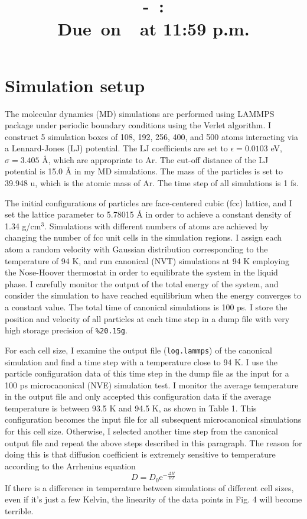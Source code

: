 \documentclass{article}
\title{
    \vspace{2in}
    \textmd{\textbf{\hmwkClassNo\ -\ \hmwkClass:\ \hmwkTitle}}\\
    \normalsize\vspace{0.1in}\small{Due\ on\ \hmwkDueDate\ at 11:59 p.m.}\\
    \vspace{0.1in}\large{\textit{\hmwkClassInstructor}}
    \vspace{3in}
}
\author{\hmwkAuthorName}
\date{}
\newcommand{\Exp}[1]{\mathrm{e}^{#1}}
\begin{document}
\maketitle

\pagebreak

\section{Simulation setup}

The molecular dynamics (MD) simulations are performed using LAMMPS package under periodic boundary conditions using the Verlet algorithm. I construct 5 simulation boxes of 108, 192, 256, 400, and 500 atoms interacting via a Lennard-Jones (LJ) potential. The LJ coefficients are set to $\epsilon = 0.0103$ eV, $\sigma = 3.405$ \AA, which are appropriate to Ar. The cut-off distance of the LJ potential is 15.0 \AA{} in my MD simulations. The mass of the particles is set to 39.948 u, which is the atomic mass of Ar. The time step of all simulations is 1 fs.

The initial configurations of particles are face-centered cubic (fcc) lattice, and I set the lattice parameter to 5.78015 \AA{} in order to achieve a constant density of 1.34 g/cm$^3$. Simulations with different numbers of atoms are achieved by changing the number of fcc unit cells in the simulation regions. I assign each atom a random velocity with Gaussian distribution corresponding to the temperature of 94 K, and run canonical (NVT) simulations at 94 K employing the Nose-Hoover thermostat in order to equilibrate the system in the liquid phase. I carefully monitor the output of the total energy of the system, and consider the simulation to have reached equilibrium when the energy converges to a constant value. The total time of canonical simulations is 100 ps. I store the position and velocity of all particles at each time step in a dump file with very high storage precision of \verb|%20.15g|.

For each cell size, I examine the output file (\verb|log.lammps|) of the canonical simulation and find a time step with a temperature close to 94 K. I use the particle configuration data of this time step in the dump file as the input for a 100 ps microcanonical (NVE) simulation test. I monitor the average temperature in the output file and only accepted this configuration data if the average temperature is between 93.5 K and 94.5 K, as shown in Table 1. This configuration becomes the input file for all subsequent microcanonical simulations for this cell size. Otherwise, I selected another time step from the canonical output file and repeat the above steps described in this paragraph. The reason for doing this is that diffusion coefficient is extremely sensitive to temperature according to the Arrhenius equation 
\begin{equation}
    D = D_0 \Exp{-\frac{\Delta H}{RT}}
\end{equation}
If there is a difference in temperature between simulations of different cell sizes, even if it's just a few Kelvin, the linearity of the data points in Fig. 4 will become terrible.
\end{document}
